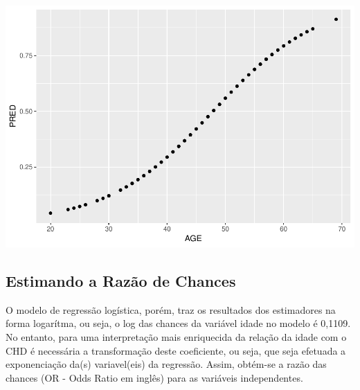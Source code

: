 \documentclass[12pt,brazil,]{book}
\newenvironment{Shaded}{\begin{snugshade}}{\end{snugshade}}
\newcommand{\CommentTok}[1]{\textcolor[rgb]{0.56,0.35,0.01}{\textit{#1}}}
\newcommand{\DataTypeTok}[1]{\textcolor[rgb]{0.13,0.29,0.53}{#1}}
\newcommand{\DecValTok}[1]{\textcolor[rgb]{0.00,0.00,0.81}{#1}}
\newcommand{\KeywordTok}[1]{\textcolor[rgb]{0.13,0.29,0.53}{\textbf{#1}}}
\newcommand{\NormalTok}[1]{#1}
\newcommand{\OperatorTok}[1]{\textcolor[rgb]{0.81,0.36,0.00}{\textbf{#1}}}
\newcommand{\StringTok}[1]{\textcolor[rgb]{0.31,0.60,0.02}{#1}}
\begin{document}
\begin{Shaded}
\end{Shaded}

\includegraphics{05-RegLogist_files/figure-latex/unnamed-chunk-5-1.pdf}

\hypertarget{estimando-a-razao-de-chances}{%
\subsection{Estimando a Razão de
Chances}\label{estimando-a-razao-de-chances}}

O modelo de regressão logística, porém, traz os resultados dos
estimadores na forma logarítma, ou seja, o log das chances da variável
idade no modelo é 0,1109. No entanto, para uma interpretação mais
enriquecida da relação da idade com o CHD é necessária a transformação
deste coeficiente, ou seja, que seja efetuada a exponenciação da(s)
variavel(eis) da regressão. Assim, obtém-se a razão das chances (OR -
Odds Ratio em inglês) para as variáveis independentes.
\end{document}

